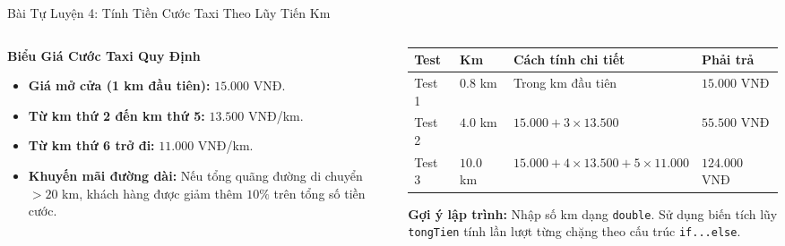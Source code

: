 \documentclass[aspectratio=169, 10pt]{beamer}
\begin{document}
\begin{frame}{Bài Tự Luyện 4: Tính Tiền Cước Taxi Theo Lũy Tiến Km}
  \begin{columns}[T]
    \begin{column}{0.48\textwidth}
      \begin{block}{\textbf{Biểu Giá Cước Taxi Quy Định}}
        \begin{itemize}
          \item \textbf{Giá mở cửa (1 km đầu tiên):} $15.000$ VNĐ.
          \item \textbf{Từ km thứ 2 đến km thứ 5:} $13.500$ VNĐ/km.
          \item \textbf{Từ km thứ 6 trở đi:} $11.000$ VNĐ/km.
          \item \textbf{Khuyến mãi đường dài:} Nếu tổng quãng đường di chuyển $> 20$ km, khách hàng được giảm thêm $10\%$ trên tổng số tiền cước.
        \end{itemize}
      \end{block}
    \end{column}
    \begin{column}{0.48\textwidth}
      \begin{table}[h]
        \centering
        \scriptsize
        \begin{tabularx}{\textwidth}{p{1cm}p{1.4cm}Xp{1.7cm}}
          \toprule
          \textbf{Test} & \textbf{Km} & \textbf{Cách tính chi tiết} & \textbf{Phải trả} \\
          \midrule
          Test 1 & $0.8$ km & Trong km đầu tiên & $15.000$ VNĐ \\
          \addlinespace
          Test 2 & $4.0$ km & $15.000 + 3 \times 13.500$ & $55.500$ VNĐ \\
          \addlinespace
          Test 3 & $10.0$ km & $15.000 + 4 \times 13.500 + 5 \times 11.000$ & $124.000$ VNĐ \\
          \bottomrule
        \end{tabularx}
      \end{table}
      \begin{tcolorbox}[colback=UniLightBlue!30,colframe=UniBlue]
        \textbf{Gợi ý lập trình:} Nhập số km dạng \texttt{double}. Sử dụng biến tích lũy \texttt{tongTien} tính lần lượt từng chặng theo cấu trúc \texttt{if...else}.
      \end{tcolorbox}
    \end{column}
  \end{columns}
\end{frame}
\end{document}
